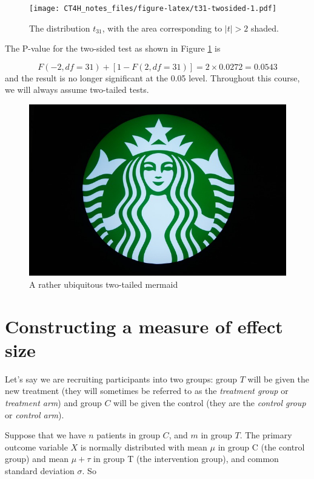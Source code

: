 \documentclass[
  openany]{book}
\theoremstyle{definition}
\theoremstyle{definition}
\theoremstyle{definition}
\theoremstyle{definition}
\theoremstyle{remark}
\begin{document}
\begin{figure}
\centering
\texttt{[image: CT4H\_notes\_files/figure-latex/t31-twosided-1.pdf]}
\caption{\label{fig:t31-twosided}The distribution \(t_{31}\), with the area corresponding to \(|t| > 2\) shaded.}
\end{figure}

The P-value for the two-sided test as shown in Figure \ref{fig:t31-twosided} is

\[ F\left(-2, df=31\right) + \left[1 - F\left(2, df=31\right)\right] = 2\times{0.0272} = 0.0543\]
and the result is no longer significant at the 0.05 level. Throughout this course, we will always assume two-tailed tests.

\begin{figure}
\centering
\includegraphics{images/starbucks.jpg}
\caption{\label{fig:starbucks}A rather ubiquitous two-tailed mermaid}
\end{figure}

\hypertarget{sec-measDcont}{%
\section{Constructing a measure of effect size}\label{sec-measDcont}}

Let's say we are recruiting participants into two groups: group \(T\) will be given the new treatment (they will sometimes be referred to as the \emph{treatment group} or \emph{treatment arm}) and group \(C\) will be given the control (they are the \emph{control group} or \emph{control arm}).

Suppose that we have \(n\) patients in group \(C\), and \(m\) in group \(T\). The primary outcome variable \(X\) is normally distributed with mean \(\mu\) in group C (the control group) and mean \(\mu+\tau\) in group T (the intervention group), and common standard deviation \(\sigma\). So
\end{document}
